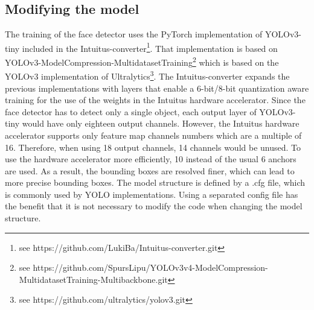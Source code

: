 \documentclass[%
a4paper,
twoside,
openany,
dvipsnames
]
{report}
\begin{document}
\subsection{Modifying the model}
The training of the face detector uses the PyTorch implementation of YOLOv3-tiny included in the Intuitus-converter\footnote{see https://github.com/LukiBa/Intuitus-converter.git}. That implementation is based on YOLOv3-ModelCompression-MultidatasetTraining\footnote{see https://github.com/SpursLipu/YOLOv3v4-ModelCompression-MultidatasetTraining-Multibackbone.git} which is based on the YOLOv3 implementation of Ultralytics\footnote{see https://github.com/ultralytics/yolov3.git}. The Intuitus-converter expands the previous implementations with layers that enable a 6-bit/8-bit quantization aware training for the use of the weights in the Intuitus hardware accelerator. 
Since the face detector has to detect only a single object, each output layer of YOLOv3-tiny would have only eighteen output channels. However, the Intuitus hardware accelerator supports only feature map channels numbers which are a multiple of 16. Therefore, when using 18 output channels, 14 channels would be unused. To use the hardware accelerator more efficiently, 10 instead of the usual 6 anchors are used. As a result, the bounding boxes are resolved finer, which can lead to more precise bounding boxes. The model structure is defined by a .cfg file, which is commonly used by YOLO implementations. Using a separated config file has the benefit that it is not necessary to modify the code when changing the model structure. \\	
\end{document}
